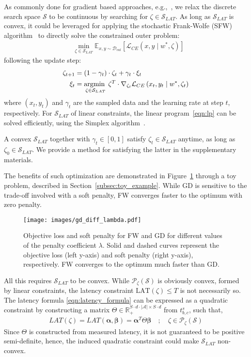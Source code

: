 \documentclass[dvipsnames,table,xcdraw]{article}
\newcommand{\argmin}{\operatornamewithlimits{argmin~}}
\newcommand{\balpha}{\bm{\alpha}}
\newcommand{\bbeta}{\bm{\beta}}
\begin{document}
As commonly done for gradient based approaches, e.g.,~\cite{liu2018darts}, we relax the discrete search space $\mathcal{S}$ to be continuous by searching for $\zeta\in \mathcal{S}_{LAT}$.
As long as $\mathcal{S}_{LAT}$ is convex, it could be leveraged for applying the stochastic Frank-Wolfe (SFW) algorithm~\cite{SFW} to directly solve the constrained outer problem:
\begin{align}\label{eqn:constrained_outer_problem}
&\min_{\zeta \in \mathcal{S}_{LAT}} \mathbb{E}_{x, y \sim\mathcal{D}_{val}}\left[\mathcal{L}_{CE}\left(x, y \mid w^*, \zeta\right)\right] 
\end{align}
following the update step:
\begin{align}\label{eqn:sfw_step}
\zeta_{t+1} &= (1-\gamma_t)\cdot\zeta_t + \gamma_t\cdot\xi_t\\
\xi_t&=\argmin_{\zeta \in \mathcal{S}_{LAT}}\zeta^T\cdot \nabla_{\zeta_t}\mathcal{L}_{CE}\left(x_t, y_t \mid w^*, \zeta_t\right)
\label{eqn:lp}
\end{align}
where $(x_t, y_t)$ and $\gamma_t$ are the sampled data and the learning rate at step $t$, respectively.
For $\mathcal{S}_{LAT}$ of linear constraints, the linear program~\eqref{eqn:lp} can be solved efficiently, using the Simplex algorithm~\cite{simplex}.

A convex $\mathcal{S}_{LAT}$ together with $\gamma_t\in[0,1]$ satisfy $\zeta_t\in\mathcal{S}_{LAT}$ anytime, as long as $\zeta_0\in\mathcal{S}_{LAT}$.
We provide a method for satisfying the latter in the supplementary materials.

The benefits of such optimization are demonstrated in Figure~\ref{fig:fw_vs_gd} through a toy problem, described in Section~\ref{subsec:toy_example}. While GD is sensitive to the trade-off involved with a soft penalty, FW converges faster to the optimum with zero penalty. 

\begin{figure}[htb]
    \centering
    \texttt{[image: images/gd\_diff\_lambda.pdf]}
    \caption{Objective loss and soft penalty for FW and GD for different values of the penalty coefficient $\lambda$. Solid and dashed curves represent the objective loss (left y-axis) and soft penalty (right y-axis), respectively. FW converges to the optimum much faster than GD.}
    \label{fig:fw_vs_gd}
\end{figure}


All this requires $\mathcal{S}_{LAT}$ to be convex. 
While $\mathcal{P}_\zeta(\mathcal{S})$ is obviously convex, formed by linear constraints, the latency constraint $\text{LAT}(\zeta)\leq T$ is not necessarily so. The latency formula \eqref{eqn:latency_formula} can be expressed as a quadratic constraint by constructing a matrix $\Theta\in\mathbb{R}_+^{S\cdot d\cdot|\mathcal{A}|\times S\cdot d}$ from $t^s_{b,c}$, such that,
\begin{align}\label{eqn:latency_matrix}
   LAT(\zeta)=LAT(\balpha, \bbeta) = \balpha^T \Theta \bbeta \quad ; \quad \zeta\in\mathcal{P}_{\zeta}(\mathcal{S})
\end{align}
Since $\Theta$ is constructed from measured latency, it is not guaranteed to be positive semi-definite, hence, the induced quadratic constraint could make $\mathcal{S}_{LAT}$ non-convex.
\end{document}
